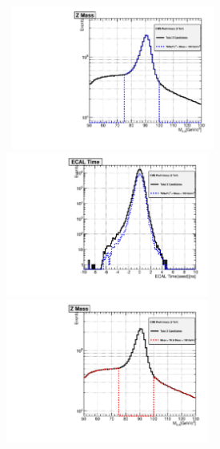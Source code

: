\paragraph*{}\mbox{}\\
\begin{minipage}{\linewidth} 
\begin{center}
\centering
\mbox{
\includegraphics[height=0.55\textwidth, width=0.5\textwidth]{THESISPLOTS/Z-CandidateOverLay-SignalMass.pdf}
\includegraphics[height=0.55\textwidth, width=0.5\textwidth]{THESISPLOTS/Z-CandidateOverLay-SignalTime.pdf}}
\mbox{
\includegraphics[height=0.55\textwidth, width=0.5\textwidth]{THESISPLOTS/Z-CandidateOverLay-BackgroundMass.pdf}
}
\end{center}
\end{minipage}

